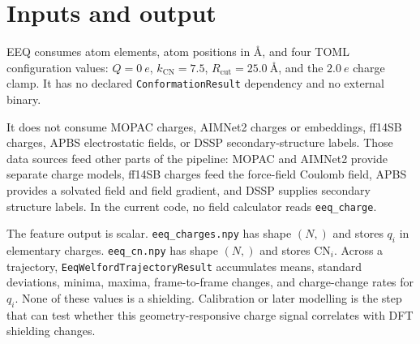 \documentclass[11pt]{article}
\begin{document}
\section{Inputs and output}

EEQ consumes atom elements, atom positions in \(\si{\angstrom}\), and four TOML
configuration values: \(Q=\SI{0}{\elementarycharge}\),
\(k_{\mathrm{CN}}=7.5\), \(R_{\mathrm{cut}}=\SI{25.0}{\angstrom}\), and the
\(\SI{2.0}{\elementarycharge}\) charge clamp. It has no declared
\texttt{ConformationResult} dependency and no external binary.

It does not consume MOPAC charges, AIMNet2 charges or embeddings, ff14SB
charges, APBS electrostatic fields, or DSSP secondary-structure labels. Those
data sources feed other parts of the pipeline: MOPAC and AIMNet2 provide
separate charge models, ff14SB charges feed the force-field Coulomb field, APBS
provides a solvated field and field gradient, and DSSP supplies secondary
structure labels. In the current code, no field calculator reads
\texttt{eeq\_charge}.

The feature output is scalar. \texttt{eeq\_charges.npy} has shape \((N,)\) and
stores \(q_i\) in elementary charges. \texttt{eeq\_cn.npy} has shape \((N,)\)
and stores \(\mathrm{CN}_i\). Across a trajectory,
\texttt{EeqWelfordTrajectoryResult} accumulates means, standard deviations,
minima, maxima, frame-to-frame changes, and charge-change rates for \(q_i\).
None of these values is a shielding. Calibration or later modelling is the step
that can test whether this geometry-responsive charge signal correlates with
DFT shielding changes.
\end{document}
